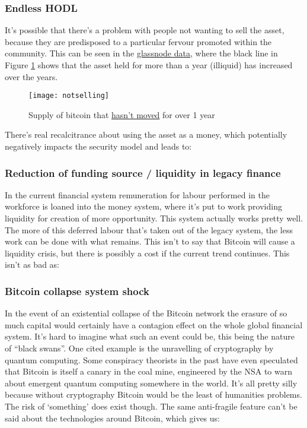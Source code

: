 \subsubsection{Endless HODL}
It's possible that there's a problem with people not wanting to sell the asset, because they are predisposed to a particular fervour promoted within the community. This can be seen in the \href{https://en.macromicro.me/charts/32355/bitcoin-supply-last-active-1plus-years-ago}{glassnode data}, where the black line in Figure \ref{fig:notselling} shows that the asset held for more than a year (illiquid) has increased over the years.
\begin{figure}
  \centering
    \texttt{[image: notselling]}
  \caption{Supply of bitcoin that \href{https://en.macromicro.me/charts/32355/bitcoin-supply-last-active-1plus-years-ago}{hasn't moved} for over 1 year}
  \label{fig:notselling}
\end{figure}
There's real recalcitrance about using the asset as a money, which potentially negatively impacts the security model \cite{Wouters2022} and leads to:
\subsubsection{Reduction of funding source / liquidity in legacy finance}
In the current financial system remuneration for labour performed in the workforce is loaned into the money system, where it's put to work providing liquidity for creation of more opportunity. This system actually works pretty well. The more of this deferred labour that's taken out of the legacy system, the less work can be done with what remains. This isn't to say that Bitcoin will cause a liquidity crisis, but there is possibly a cost if the current trend continues. This isn't as bad as:
\subsubsection{Bitcoin collapse system shock}
In the event of an existential collapse of the Bitcoin network the erasure of so much capital would certainly have a contagion effect on the whole global financial system. It's hard to imagine what such an event could be, this being the nature of ``black swans''. One cited example is the unravelling of cryptography by quantum computing. Some conspiracy theorists in the past have even speculated that Bitcoin is itself a canary in the coal mine, engineered by the NSA to warn about emergent quantum computing somewhere in the world. It's all pretty silly because without cryptography Bitcoin would be the least of humanities problems. The risk of `something' does exist though. The same anti-fragile feature can't be said about the technologies around Bitcoin, which gives us:
